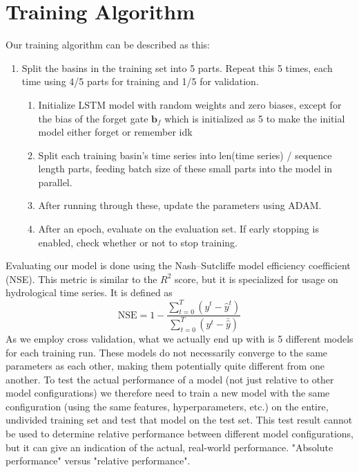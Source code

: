 \section{Training Algorithm}
Our training algorithm can be described as this:
\begin{enumerate}
    \item Split the basins in the training set into 5 parts. Repeat this 5 times, each time using 4/5 parts for training and 1/5 for validation.\begin{enumerate}
        \item Initialize LSTM model with random weights and zero biases, except for the bias of the forget gate $\bm{b}_f$ which is initialized as 5 to make the initial model either forget or remember idk \citationneeded
        \item Split each training basin's time series into len(time series) / sequence length parts, feeding batch size of these small parts into the model in parallel. 
        \item After running through these, update the parameters using ADAM.
        \item After an epoch, evaluate on the evaluation set. If early stopping is enabled, check whether or not to stop training.
    \end{enumerate}
\end{enumerate}
Evaluating our model is done using the Nash–Sutcliffe model efficiency coefficient (NSE). \cite{NSE}
This metric is similar to the $R^2$ score, but it is specialized for usage 
on hydrological time series.
It is defined as 
\begin{equation}
    \text{NSE} = 1 - \frac{\sum_{t=0}^T\left( y^t - \hat{y}^t\right)}{\sum_{t=0}^T\left(y^t - \bar{\hat{y}}\right)} \label{NSE}
\end{equation}
As we employ cross validation, what we actually end up with is 5 different models 
for each training run. These models do not necessarily converge to the same parameters 
as each other, making them potentially quite different from one another. To test the 
actual performance of a model (not just relative to other model configurations) we 
therefore need to train a new model with the same configuration (using the same features, 
hyperparameters, etc.) on the entire, undivided training set and test that model 
on the test set. This test result cannot be used to determine relative performance 
between different model configurations, but it can give an indication of the actual, 
real-world performance. "Absolute performance" versus "relative performance".
